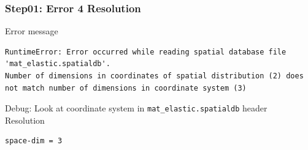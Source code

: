 \documentclass[aspectration=169]{beamer}
\newcommand{\errlabel}[1]{{\small \color{blue}#1}}
\newcommand{\debuginfo}[1]{{\small \color{green}#1}}
\begin{document}
\begin{frame}[fragile]
  \frametitle{Step01: Error 4 Resolution}

\errlabel{Error message}
\begin{lstlisting}
RuntimeError: Error occurred while reading spatial database file 'mat_elastic.spatialdb'.
Number of dimensions in coordinates of spatial distribution (2) does
not match number of dimensions in coordinate system (3)
\end{lstlisting}\pause
\errlabel{Debug:} \debuginfo{Look at coordinate system in {\tt mat\_elastic.spatialdb} header}\pause\\
\errlabel{Resolution}
\begin{lstlisting}
space-dim = 3
\end{lstlisting}

\end{frame}
\end{document}
